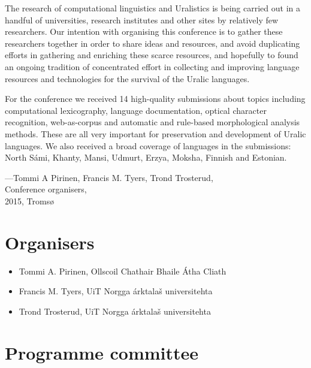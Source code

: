 \documentclass[b5paper]{book}
\begin{document}
The research of computational linguistics and Uralistics is being carried out
in a handful of universities, research institutes and other sites by
relatively few researchers. Our intention with organising this conference is to
gather these researchers together in order to share ideas and resources, and
avoid duplicating efforts in gathering and enriching these scarce resources,
and hopefully to found an ongoing tradition of concentrated effort in
collecting and improving language resources and technologies for the survival
of the Uralic languages.

For the conference we received 14 high-quality submissions about topics
including computational lexicography, language documentation, optical character
recognition, web-as-corpus and automatic and rule-based morphological
analysis methods.  These are all very important for preservation and
development of Uralic languages. We also received a broad coverage of 
languages in the submissions: North Sámi, Khanty, Mansi, Udmurt, Erzya, Moksha, Finnish
and Estonian. 

\noindent ---Tommi A Pirinen, Francis M. Tyers, Trond Trosterud,\\
Conference organisers,\\
2015, Tromsø


\chapter*{Organisers}

\begin{itemize}
    \item Tommi A. Pirinen, Ollscoil Chathair Bhaile Átha Cliath
    \item Francis M. Tyers, UiT Norgga árktalaš universitehta
    \item Trond Trosterud, UiT Norgga árktalaš universitehta
\end{itemize}

\chapter*{Programme committee}
\end{document}
